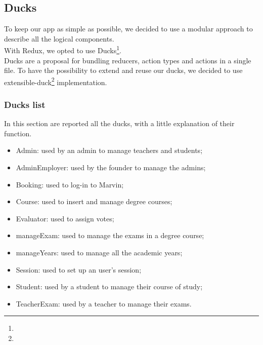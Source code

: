 \documentclass[../redux]{subfiles}
\begin{document}
	\subsection{Ducks}
	To keep our app as simple as possible, we decided to use a modular approach to describe all the logical components.\\
	With Redux, we opted to use Ducks\footnote{}.\\
	Ducks are a proposal for bundling reducers, action types and actions in a single file. To have the possibility to extend and reuse our ducks, we decided to use extensible-duck\footnote{} implementation.

	\subsubsection{Ducks list}
	In this section are reported all the ducks, with a little explanation of their function.
	\begin{itemize}
		\item Admin: used by an admin to manage teachers and students;
		\item AdminEmployer: used by the founder to manage the admins;
		\item Booking: used to log-in to Marvin;
		\item Course: used to insert and manage degree courses;
		\item Evaluator: used to assign votes;
		\item manageExam: used to manage the exams in a degree course;
		\item manageYears: used to manage all the academic years;
		\item Session: used to set up an user's session;
		\item Student: used by a student to manage their course of study;
		\item TeacherExam: used by a teacher to manage their exams.
	\end{itemize}
\end{document}
